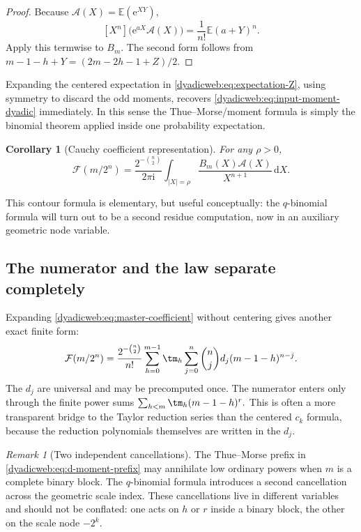\documentclass[11pt,oneside]{article}
\newtheorem{corollary}[theorem]{Corollary}
\theoremstyle{definition}
\theoremstyle{remark}
\newtheorem{remark}[theorem]{Remark}
\newcommand{\e}{\mathrm e}
\newcommand{\ii}{\mathrm i}
\newcommand{\dd}{\,\mathrm d}
\newcommand{\E}{\mathbb E}
\begin{document}
\begin{proof}
Because $\mathscr A(X)=\E(\e^{XY})$,
\[
 [X^n]\bigl(\e^{aX}\mathscr A(X)\bigr)
 =\frac1{n!}\E(a+Y)^n.
\]
Apply this termwise to $B_m$.  The second form follows from
$m-1-h+Y=(2m-2h-1+Z)/2$.
\end{proof}

Expanding the centered expectation in \eqref{dyadicweb:eq:expectation-Z}, using symmetry to discard the
odd moments, recovers \eqref{dyadicweb:eq:input-moment-dyadic} immediately.  In this sense the
Thue--Morse/moment formula is simply the binomial theorem applied inside one probability
expectation.

\begin{corollary}[Cauchy coefficient representation]
\label{dyadicweb:cor:cauchy-X}
For any $\rho>0$,
\begin{equation}
 \mathcal F(m/2^n)
 =\frac{2^{-\binom n2}}{2\pi\ii}
  \int_{|X|=\rho}\frac{B_m(X)\mathscr A(X)}{X^{n+1}}\dd X. \label{dyadicweb:eq:cauchy-X}
\end{equation}
\end{corollary}

This contour formula is elementary, but useful conceptually: the $q$-binomial formula will
turn out to be a second residue computation, now in an auxiliary geometric node variable.

\subsection{The numerator and the law separate completely}

Expanding \eqref{dyadicweb:eq:master-coefficient} without centering gives another exact finite form:
\begin{equation}
 \mathcal F(m/2^n)
 =\frac{2^{-\binom n2}}{n!}
 \sum_{h=0}^{m-1}\tm_h
 \sum_{j=0}^{n}\binom njd_j(m-1-h)^{n-j}.                 \label{dyadicweb:eq:d-moment-prefix}
\end{equation}
The $d_j$ are universal and may be precomputed once.  The numerator enters only through the
finite power sums
\(
 \sum_{h<m}\tm_h(m-1-h)^r.
\)
This is often a more transparent bridge to the Taylor reduction series than the centered
$c_k$ formula, because the reduction polynomials themselves are written in the $d_j$.

\begin{remark}[Two independent cancellations]
The Thue--Morse prefix in \eqref{dyadicweb:eq:d-moment-prefix} may annihilate low ordinary powers when
$m$ is a complete binary block.  The $q$-binomial formula introduces a second cancellation
across the geometric scale index.  These cancellations live in different variables and should
not be conflated: one acts on $h$ or $r$ inside a binary block, the other on the scale node
$-2^k$.
\end{remark}
\end{document}
